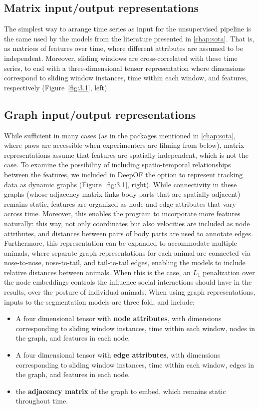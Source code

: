 \subsection{Matrix input/output representations}

The simplest way to arrange time series as input for the unsupervised pipeline is the same used by the models from the literature presented in \cref{chap:sota}. That is, as matrices of features over time, where different attributes are assumed to be independent. Moreover, sliding windows are cross-correlated with these time series, to end with a three-dimensional tensor representation where dimensions correspond to sliding window instances, time within each window, and features, respectively (Figure~\ref{fig:3.1}, left).

\subsection{Graph input/output representations}

While sufficient in many cases (as in the packages mentioned in \cref{chap:sota}, where paws are accessible when experimenters are filming from below), matrix representations assume that features are spatially independent, which is not the case.
To examine the possibility of including spatio-temporal relationships between the features, we included in DeepOF the option to represent tracking data as dynamic graphs (Figure~\ref{fig:3.1}, right). While connectivity in these graphs (whose adjacency matrix links body parts that are spatially adjacent) remains static, features are organized as node and edge attributes that vary across time. Moreover, this enables the program to incorporate more features naturally: this way, not only coordinates but also velocities are included as node attributes, and distances between pairs of body parts are used to annotate edges.
Furthermore, this representation can be expanded to accommodate multiple animals, where separate graph representations for each animal are connected via nose-to-nose, nose-to-tail, and tail-to-tail edges, enabling the models to include relative distances between animals. When this is the case, an $L_1$ penalization over the node embeddings controls the influence social interactions should have in the results, over the posture of individual animals. When using graph representations, inputs to the segmentation models are three fold, and include:

\begin{itemize}
    \item A four dimensional tensor with \textbf{node attributes}, with dimensions corresponding to sliding window instances, time within each window, nodes in the graph, and features in each node.
    \item A four dimensional tensor with \textbf{edge attributes}, with dimensions corresponding to sliding window instances, time within each window, edges in the graph, and features in each node.
    \item the \textbf{adjacency matrix} of the graph to embed, which remains static throughout time.
\end{itemize}

